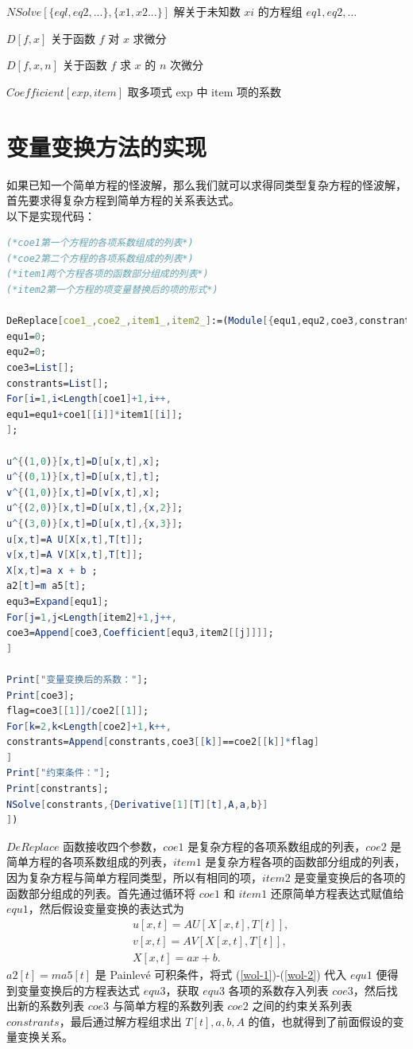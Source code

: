 $NSolve[\{eql,eq2,...\},\{x1, x2...\}]$   \quad    解关于未知数 $xi$ 的方程组 $eq1,eq2,...$

$D[f,x]$     \quad                    关于函数 $f$ 对 $x$ 求微分

$D[f,{x,n}]$     \quad                    关于函数 $f$ 求 $x$ 的 $n$ 次微分

$Coefficient[exp,item]$   \quad       取多项式 exp 中 item 项的系数
\section{变量变换方法的实现}
如果已知一个简单方程的怪波解，那么我们就可以求得同类型复杂方程的怪波解，首先要求得复杂方程到简单方程的关系表达式。\\

以下是实现代码：
\begin{lstlisting}[language=Mathematica,caption=变量变换方法的实现]
(*coe1第一个方程的各项系数组成的列表*)
(*coe2第二个方程的各项系数组成的列表*)
(*item1两个方程各项的函数部分组成的列表*)
(*item2第一个方程的项变量替换后的项的形式*)

DeReplace[coe1_,coe2_,item1_,item2_]:=(Module[{equ1,equ2,coe3,constrants,i,j,k},
equ1=0;
equ2=0;
coe3=List[];
constrants=List[];
For[i=1,i<Length[coe1]+1,i++,
equ1=equ1+coe1[[i]]*item1[[i]];
];

u^{(1,0)}[x,t]=D[u[x,t],x];
u^{(0,1)}[x,t]=D[u[x,t],t];
v^{(1,0)}[x,t]=D[v[x,t],x];
u^{(2,0)}[x,t]=D[u[x,t],{x,2}];
u^{(3,0)}[x,t]=D[u[x,t],{x,3}];
u[x,t]=A U[X[x,t],T[t]];
v[x,t]=A V[X[x,t],T[t]];
X[x,t]=a x + b ;
a2[t]=m a5[t];
equ3=Expand[equ1];
For[j=1,j<Length[item2]+1,j++,
coe3=Append[coe3,Coefficient[equ3,item2[[j]]]];
]

Print["变量变换后的系数："];
Print[coe3];
flag=coe3[[1]]/coe2[[1]];
For[k=2,k<Length[coe2]+1,k++,
constrants=Append[constrants,coe3[[k]]==coe2[[k]]*flag]
]
Print["约束条件："];
Print[constrants];
NSolve[constrants,{Derivative[1][T][t],A,a,b}]
])
\end{lstlisting}
$DeReplace$ 函数接收四个参数，$coe1$ 是复杂方程的各项系数组成的列表，$coe2$ 是简单方程的各项系数组成的列表，$item1$ 是复杂方程各项的函数部分组成的列表，因为复杂方程与简单方程同类型，所以有相同的项，$item2$ 是变量变换后的各项的函数部分组成的列表。首先通过循环将 $coe1$ 和 $item1$ 还原简单方程表达式赋值给 $equ1$，然后假设变量变换的表达式为
\begin{align}
&u[x,t]=A U[X[x,t],T[t]],\label{wol-1}\\
&v[x,t]=A V[X[x,t],T[t]],\\
&X[x,t]=a x + b. \label{wol-2}
\end{align}
$a2[t]=m a5[t]$ 是 Painlev\'{e} 可积条件，将式 (\ref{wol-1})-(\ref{wol-2}) 代入 $equ1$ 便得到变量变换后的方程表达式 $equ3$，获取 $equ3$ 各项的系数存入列表 $coe3$，然后找出新的系数列表 $coe3$ 与简单方程的系数列表 $coe2$ 之间的约束关系列表 $constrants$，最后通过解方程组求出 $T[t], a, b, A$ 的值，也就得到了前面假设的变量变换关系。

